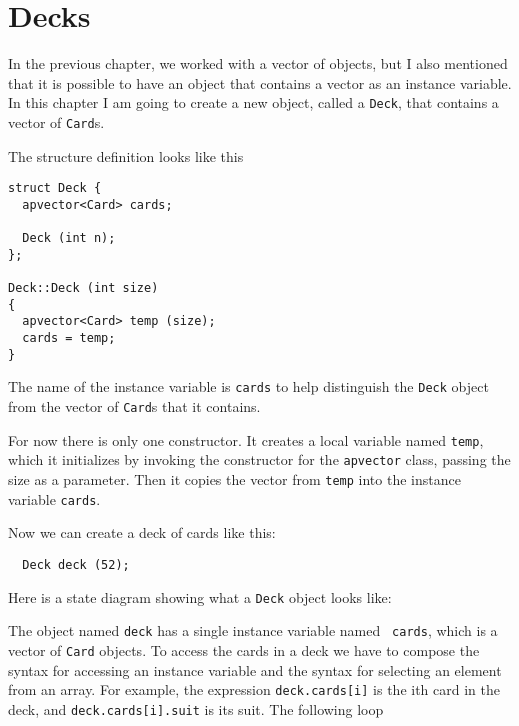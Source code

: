 \section{Decks}
\label{deck}

In the previous chapter, we worked with a vector of objects,
but I also mentioned that it is possible to have an object
that contains a vector as an instance variable.  In this
chapter I am going to create a new object, called a {\tt Deck},
that contains a vector of {\tt Card}s.


The structure definition looks like this

\begin{verbatim}
struct Deck {
  apvector<Card> cards;

  Deck (int n);
};

Deck::Deck (int size)
{
  apvector<Card> temp (size);
  cards = temp;
}
\end{verbatim}
%
The name of the instance variable is {\tt cards} to help
distinguish the {\tt Deck} object from the vector of {\tt Card}s
that it contains.


For now there is only one constructor.  It creates a local variable
named {\tt temp}, which it initializes by invoking the constructor
for the {\tt apvector} class, passing the size as a parameter.
Then it copies the vector from {\tt temp} into the instance
variable {\tt cards}.

Now we can create a deck of cards like this:

\begin{verbatim}
  Deck deck (52);
\end{verbatim}
%
Here is a state diagram showing what a
{\tt Deck} object looks like:


\vspace {0.1in}
\centerline{}
\vspace {0.1in}

The object named {\tt deck} has a single instance variable named {\tt
cards}, which is a vector of {\tt Card} objects.  To access the cards
in a deck we have to compose the syntax for accessing an
instance variable and the syntax for selecting an element from an
array.  For example, the expression {\tt deck.cards[i]} is the ith
card in the deck, and {\tt deck.cards[i].suit} is its suit.
The following loop

